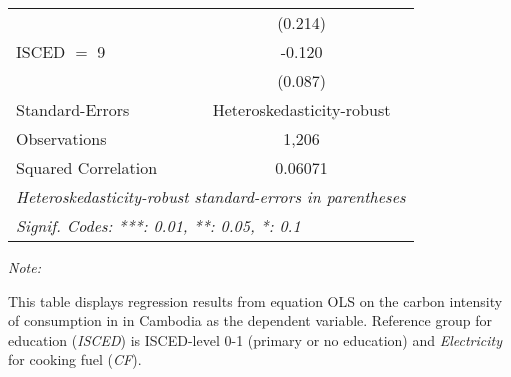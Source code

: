 \begin{table}[htbp!]
\begin{adjustbox}{width = 1\textwidth, max height = 0.95\textheight, center}
\begin{threeparttable}[b]
\begin{tabular}{lc}
                                & (0.214)\\   
            ISCED $=$ 9         & -0.120\\   
                                & (0.087)\\   
            \midrule 
            Standard-Errors     & Heteroskedasticity-robust \\   
            Observations        & 1,206\\  
            Squared Correlation & 0.06071\\  
            \midrule \midrule
            \multicolumn{2}{l}{\emph{Heteroskedasticity-robust standard-errors in parentheses}}\\
            \multicolumn{2}{l}{\emph{Signif. Codes: ***: 0.01, **: 0.05, *: 0.1}}\\
         \end{tabular}
         
         \begin{tablenotes}\item \medskip \textit{Note:}
            \item This table displays regression results from equation OLS on the carbon intensity of consumption in  in Cambodia as the dependent variable. Reference group for education (\textit{ISCED}) is ISCED-level 0-1 (primary or no education) and \textit{Electricity} for cooking fuel (\textit{CF}).
         \end{tablenotes}
      \end{threeparttable}
   \end{adjustbox}
\end{table}


